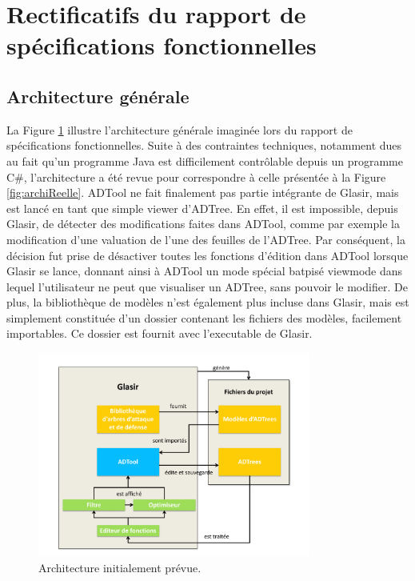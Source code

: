 \section{Rectificatifs du rapport de spécifications fonctionnelles}
\label{sec:rect}

\subsection{Architecture générale}
\label{subsec:archi}
La {\sc Figure} \ref{fig:archiPrevue} illustre l'architecture générale imaginée lors du rapport de spécifications fonctionnelles. Suite à des contraintes techniques, notamment dues au fait qu'un programme Java est difficilement contrôlable depuis un programme C\#, l'architecture a été revue pour correspondre à celle présentée à la {\sc Figure} \ref{fig:archiReelle}. ADTool ne fait finalement pas partie intégrante de Glasir, mais est lancé en tant que simple \og viewer \fg{} d'ADTree. En effet, il est impossible, depuis Glasir, de détecter des modifications faites dans ADTool, comme par exemple la modification d'une valuation de l'une des feuilles de l'ADTree. Par conséquent, la décision fut prise de désactiver toutes les fonctions d'édition dans ADTool lorsque Glasir se lance, donnant ainsi à ADTool un mode spécial batpisé \og viewmode \fg{} dans lequel l'utilisateur ne peut que visualiser un ADTree, sans pouvoir le modifier. De plus, la bibliothèque de modèles n'est également plus incluse dans Glasir, mais est simplement constituée d'un dossier contenant les fichiers des modèles, facilement importables. Ce dossier est fournit avec l'executable de Glasir.

		\begin{figure}[H]
            \centering
                \includegraphics[width=0.8\textwidth]{figure/archiGlasir.pdf}
            \caption{Architecture initialement prévue.}
            \label{fig:archiPrevue}
        \end{figure}
	
